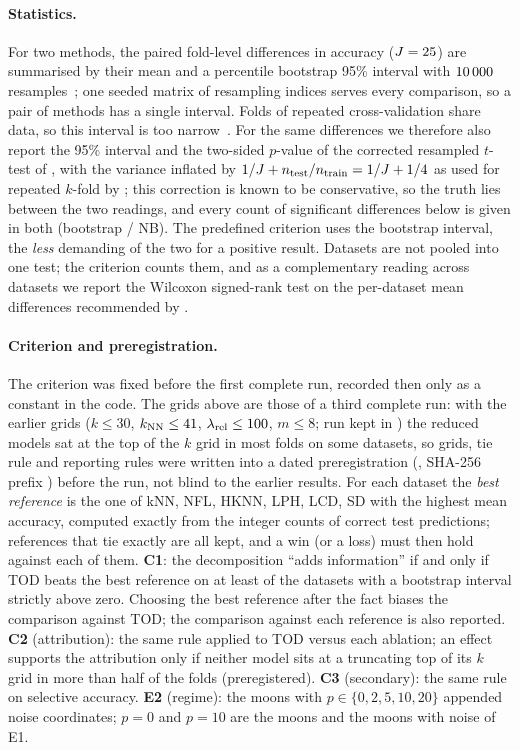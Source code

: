\documentclass[10pt,a4paper]{article}
\theoremstyle{plain}
\theoremstyle{definition}
\theoremstyle{remark}
\newcommand{\meth}[1]{\textsf{#1}}
\newcommand{\kNN}{k_{\rm NN}}
\begin{document}
\paragraph{Statistics.} For two methods, the paired fold-level differences in accuracy ($J=25$) are summarised by their mean and a percentile bootstrap 95\% interval with $10\,000$ resamples~\citep{efrontibshirani1993}; one seeded matrix of resampling indices serves every comparison, so a pair of methods has a single interval. Folds of repeated cross-validation share data, so this interval is too narrow~\citep{dietterich1998}. For the same differences we therefore also report the 95\% interval and the two-sided $p$-value of the corrected resampled $t$-test of \citet{nadeaubengio2003}, with the variance inflated by $1/J+n_{\rm test}/n_{\rm train}=1/J+1/4$ as used for repeated $k$-fold by \citet{bouckaertfrank2004}; this correction is known to be conservative, so the truth lies between the two readings, and every count of significant differences below is given in both (bootstrap / NB). The predefined criterion uses the bootstrap interval, the \emph{less} demanding of the two for a positive result. Datasets are not pooled into one test; the criterion counts them, and as a complementary reading across datasets we report the Wilcoxon signed-rank test on the per-dataset mean differences recommended by \citet{demsar2006}.

\paragraph{Criterion and preregistration.} The criterion was fixed before the first complete run, recorded then only as a constant in the code. The grids above are those of a third complete run: with the earlier grids ($k\le30$, $\kNN\le41$, $\lambda_{\rm rel}\le100$, $m\le8$; run kept in ) the reduced models sat at the top of the $k$ grid in most folds on some datasets, so grids, tie rule and reporting rules were written into a dated preregistration (, SHA-256 prefix \texttt{\MetaPreregSha}) before the run, not blind to the earlier results. For each dataset the \emph{best reference} is the one of \meth{kNN}, \meth{NFL}, \meth{HKNN}, \meth{LPH}, \meth{LCD}, \meth{SD} with the highest mean accuracy, computed exactly from the integer counts of correct test predictions; references that tie exactly are all kept, and a win (or a loss) must then hold against each of them. \textbf{C1}: the decomposition ``adds information'' if and only if \meth{TOD} beats the best reference on at least \NRequired{} of the \NDatasets{} datasets with a bootstrap interval strictly above zero. Choosing the best reference after the fact biases the comparison against \meth{TOD}; the comparison against each reference is also reported. \textbf{C2} (attribution): the same rule applied to \meth{TOD} versus each ablation; an effect supports the attribution only if neither model sits at a truncating top of its $k$ grid in more than half of the folds (preregistered). \textbf{C3} (secondary): the same rule on selective accuracy. \textbf{E2} (regime): the moons with $p\in\{0,2,5,10,20\}$ appended noise coordinates; $p=0$ and $p=10$ are the moons and the moons with noise of E1.
\end{document}
